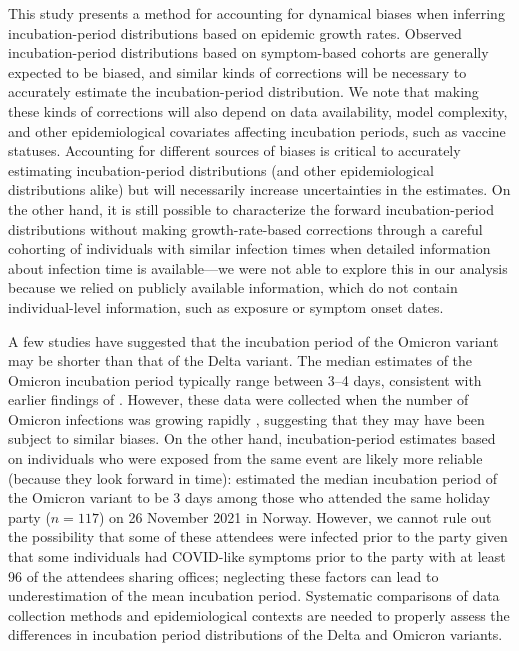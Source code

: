 \documentclass[12pt]{article}
\begin{document}
This study presents a method for accounting for dynamical biases when inferring incubation-period distributions based on epidemic growth rates.
Observed incubation-period distributions based on symptom-based cohorts are generally expected to be biased, and similar kinds of corrections will be necessary to accurately estimate the incubation-period distribution.
We note that making these kinds of corrections will also depend on data availability, model complexity, and other epidemiological covariates affecting incubation periods, such as vaccine statuses. 
Accounting for different sources of biases is critical to accurately estimating incubation-period distributions (and other epidemiological distributions alike) but will necessarily increase uncertainties in the estimates.
On the other hand, it is still possible to characterize the forward incubation-period distributions without making growth-rate-based corrections through a careful cohorting of individuals with similar infection times when detailed information about infection time is available---we were not able to explore this in our analysis because we relied on publicly available information, which do not contain individual-level information, such as exposure or symptom onset dates.

A few studies have suggested that the incubation period of the Omicron variant may be shorter than that of the Delta variant.
The median estimates of the Omicron incubation period typically range between 3--4 days, consistent with earlier findings of \citep{backer2021omicron}. 
However, these data were collected when the number of Omicron infections was growing rapidly \citep{jansen2021investigation,song2022serial}, suggesting that they may have been subject to similar biases.
On the other hand, incubation-period estimates based on individuals who were exposed from the same event are likely more reliable (because they look forward in time):
\cite{brandal2021outbreak} estimated the median incubation period of the Omicron variant to be 3 days among those who attended the same holiday party ($n=117$) on 26 November 2021 in Norway. 
However, we cannot rule out the possibility that some of these attendees were infected prior to the party given that some individuals had COVID-like symptoms prior to the party with at least 96 of the attendees sharing offices; neglecting these factors can lead to underestimation of the mean incubation period.
Systematic comparisons of data collection methods and epidemiological contexts are needed to properly assess the differences in incubation period distributions of the Delta and Omicron variants.
\end{document}

